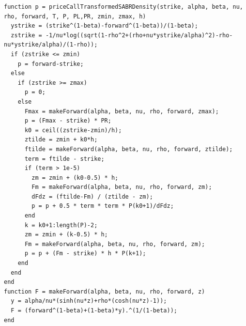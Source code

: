 \documentclass[]{rAMF2e}
\begin{document}
\begin{center}
\begin{lstlisting}
function p = priceCallTransformedSABRDensity(strike, alpha, beta, nu, rho, forward, T, P, PL,PR, zmin, zmax, h) 
  ystrike = (strike^(1-beta)-forward^(1-beta))/(1-beta);
  zstrike = -1/nu*log((sqrt(1-rho^2+(rho+nu*ystrike/alpha)^2)-rho-nu*ystrike/alpha)/(1-rho));
  if (zstrike <= zmin)
    p = forward-strike;
  else 
    if (zstrike >= zmax)
      p = 0;
    else
      Fmax = makeForward(alpha, beta, nu, rho, forward, zmax);
      p = (Fmax - strike) * PR;
      k0 = ceil((zstrike-zmin)/h);
      ztilde = zmin + k0*h;
      ftilde = makeForward(alpha, beta, nu, rho, forward, ztilde);
      term = ftilde - strike;
      if (term > 1e-5)
        zm = zmin + (k0-0.5) * h;
        Fm = makeForward(alpha, beta, nu, rho, forward, zm); 
        dFdz = (ftilde-Fm) / (ztilde - zm);
        p = p + 0.5 * term * term * P(k0+1)/dFdz;
      end
      k = k0+1:length(P)-2;
      zm = zmin + (k-0.5) * h;        
      Fm = makeForward(alpha, beta, nu, rho, forward, zm);     
      p = p + (Fm - strike) * h * P(k+1);
    end
  end
end
function F = makeForward(alpha, beta, nu, rho, forward, z) 
  y = alpha/nu*(sinh(nu*z)+rho*(cosh(nu*z)-1));
  F = (forward^(1-beta)+(1-beta)*y).^(1/(1-beta));
end
\end{lstlisting}
\end{center}
\end{document}
